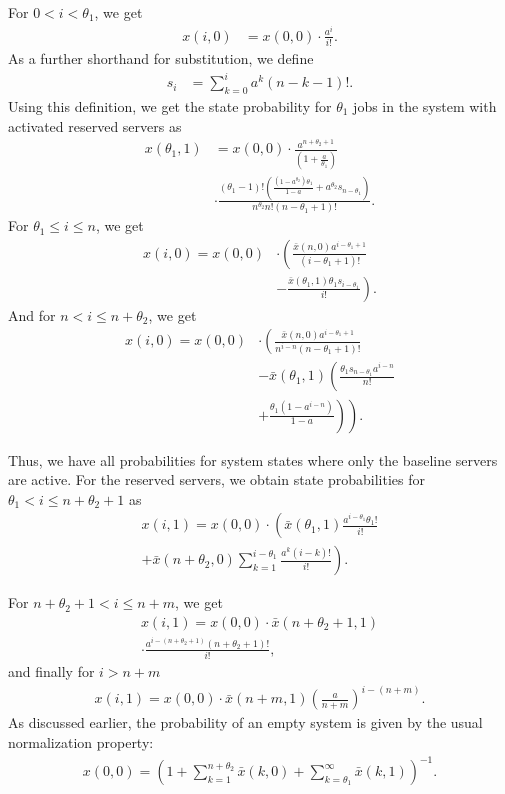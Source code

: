 For \(0 < i <\theta_1\), we get
\begin{align*}
x(i, 0) &= x(0, 0) \cdot \frac{a^i}{i!}.
\end{align*}
As a further shorthand for substitution, we define
\begin{align*}
s_i&=\sum_{k=0}^{i}a^k(n-k-1)!.
\end{align*}
Using this definition, we get the state probability for \(\theta_1\) jobs in the system with activated reserved servers as
\begin{align*}
x(\theta_1, 1) &= x(0, 0)\cdot \frac{a^{n+\theta_2+1}}{\left(1+\frac{a}{\theta_1}\right)}\\
&\cdot\frac{\left(\theta_1-1\right)!\left(\frac{(1-a^{\theta_2})\theta_1}{1-a}+a^{\theta_2}s_{n-\theta_1}\right)}{n^{\theta_2}n!\left(n-\theta_1+1\right)!}.
\end{align*}
For \(\theta_1\leq i\leq n\), we get
\begin{align*}
x(i, 0) = x(0, 0) &\cdot \left(\frac{\bar{x}(n, 0) a^{i-\theta_1+1}}{(i-\theta_1+1)!}\right.\\
&\left.- \frac{\bar{x}(\theta_1,1) \theta_1 s_{i-\theta_1}}{i!}\right).
\end{align*}
And for \(n<i\leq n+\theta_2\), we get
\begin{align*}
x(i, 0) = x(0, 0) &\cdot \left(\frac{\bar{x}(n,0) a^{i-\theta_1+1}}{n^{i-n}(n-\theta_1+1)!}\right.\\
&\left.-\bar{x}(\theta_1,1)\left(\frac{\theta_1 s_{n-\theta_1} a^{i-n}}{n!}\right.\right.\\
&\left.\left.+ \frac{\theta_1(1-a^{i-n})}{1-a}\right)\right).
\end{align*}

Thus, we have all probabilities for system states where only the baseline servers are active. For the reserved servers, we obtain state probabilities for \(\theta_1<i\leq n+\theta_2+1\) as
\begin{align*}
x(i, 1) = x(0, 0) \cdot \left(\bar{x}(\theta_1, 1)\frac{a^{i-\theta_1}\theta_1!}{i!}\right.\\
\left.+\bar{x}(n+\theta_2,0)\sum_{k=1}^{i-\theta_1}\frac{a^k(i-k)!}{i!}\right).
\end{align*}

For \(n+\theta_2+1 < i \leq n + m\), we get
\begin{align*}
x(i, 1) = x(0, 0)\cdot \bar{x}(n+\theta_2+1,1)\\ \cdot\frac{a^{i-(n+\theta_2+1)}(n+\theta_2+1)!}{i!},
\end{align*}
and finally for \(i>n+m\)
\begin{align*}
x(i, 1) = x(0, 0)\cdot \bar{x}(n+m,1) \left(\frac{a}{n+m}\right)^{i-(n+m)}.
\end{align*}
As discussed earlier, the probability of an empty system is given by the usual normalization property:
\begin{align*}
x(0, 0)=\left(1 +\sum_{k=1}^{n+\theta_2}\bar{x}(k, 0) + \sum_{k=\theta_1}^{\infty}\bar{x}(k,1)\right)^{-1}.
\end{align*}

